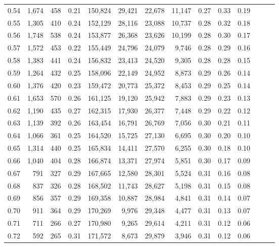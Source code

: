 \begin{tabular}{rrrrrrrrrrrrrr}
0.54 &  1,674 &  458 &  0.21 &  150,824 &   29,421 &  22,678 &  11,147 &  0.27 &  0.33 &      0.19 \\
0.55 &  1,305 &  410 &  0.24 &  152,129 &   28,116 &  23,088 &  10,737 &  0.28 &  0.32 &      0.18 \\
0.56 &  1,748 &  538 &  0.24 &  153,877 &   26,368 &  23,626 &  10,199 &  0.28 &  0.30 &      0.17 \\
0.57 &  1,572 &  453 &  0.22 &  155,449 &   24,796 &  24,079 &   9,746 &  0.28 &  0.29 &      0.16 \\
0.58 &  1,383 &  441 &  0.24 &  156,832 &   23,413 &  24,520 &   9,305 &  0.28 &  0.28 &      0.15 \\
0.59 &  1,264 &  432 &  0.25 &  158,096 &   22,149 &  24,952 &   8,873 &  0.29 &  0.26 &      0.14 \\
0.60 &  1,376 &  420 &  0.23 &  159,472 &   20,773 &  25,372 &   8,453 &  0.29 &  0.25 &      0.14 \\
0.61 &  1,653 &  570 &  0.26 &  161,125 &   19,120 &  25,942 &   7,883 &  0.29 &  0.23 &      0.13 \\
0.62 &  1,190 &  435 &  0.27 &  162,315 &   17,930 &  26,377 &   7,448 &  0.29 &  0.22 &      0.12 \\
0.63 &  1,139 &  392 &  0.26 &  163,454 &   16,791 &  26,769 &   7,056 &  0.30 &  0.21 &      0.11 \\
0.64 &  1,066 &  361 &  0.25 &  164,520 &   15,725 &  27,130 &   6,695 &  0.30 &  0.20 &      0.10 \\
0.65 &  1,314 &  440 &  0.25 &  165,834 &   14,411 &  27,570 &   6,255 &  0.30 &  0.18 &      0.10 \\
0.66 &  1,040 &  404 &  0.28 &  166,874 &   13,371 &  27,974 &   5,851 &  0.30 &  0.17 &      0.09 \\
0.67 &    791 &  327 &  0.29 &  167,665 &   12,580 &  28,301 &   5,524 &  0.31 &  0.16 &      0.08 \\
0.68 &    837 &  326 &  0.28 &  168,502 &   11,743 &  28,627 &   5,198 &  0.31 &  0.15 &      0.08 \\
0.69 &    856 &  357 &  0.29 &  169,358 &   10,887 &  28,984 &   4,841 &  0.31 &  0.14 &      0.07 \\
0.70 &    911 &  364 &  0.29 &  170,269 &    9,976 &  29,348 &   4,477 &  0.31 &  0.13 &      0.07 \\
0.71 &    711 &  266 &  0.27 &  170,980 &    9,265 &  29,614 &   4,211 &  0.31 &  0.12 &      0.06 \\
0.72 &    592 &  265 &  0.31 &  171,572 &    8,673 &  29,879 &   3,946 &  0.31 &  0.12 &      0.06 \\

\end{tabular}
